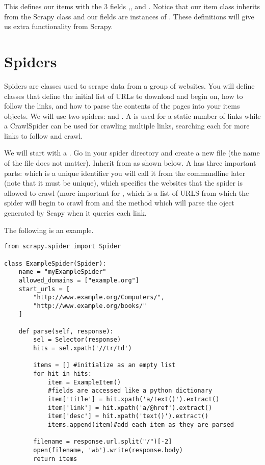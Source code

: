 This defines our items with the 3 fields ,, and . 
Notice that our item class inherits from the Scrapy class  and our fields are instances of . 
These definitions will give us extra functionality from Scrapy.

\section*{Spiders}
Spiders are classes used to scrape data from a group of websites. 
You will define classes that define the initial list of URLs to download and begin on, how to follow the links, and how to parse the contents of the pages into your items objects. We will use two spiders:  and . 
A  is used for a static number of links while a CrawlSpider can be used for crawling multiple links, searching each for more links to follow and crawl.

We will start with a . 
Go in your spider directory and create a new file (the name of the file does not matter). 
Inherit from  as shown below. 
A  has three important parts:  which is a unique identifier you will call it from the commandline later (note that it must be unique),  which specifies the websites that the spider is allowed to crawl (more important for ,  which is a list of URLS from which the spider will begin to crawl from and the method  which will parse the  oject generated by Scapy when it queries each link. 

The following is an example.
\begin{lstlisting}
from scrapy.spider import Spider

class ExampleSpider(Spider):
    name = "myExampleSpider"
    allowed_domains = ["example.org"]
    start_urls = [
        "http://www.example.org/Computers/",
        "http://www.example.org/books/"
    ]

    def parse(self, response):
        sel = Selector(response)
        hits = sel.xpath('//tr/td')

        items = [] #initialize as an empty list
        for hit in hits:
            item = ExampleItem()
			#fields are accessed like a python dictionary
            item['title'] = hit.xpath('a/text()').extract()
            item['link'] = hit.xpath('a/@href').extract()
            item['desc'] = hit.xpath('text()').extract()
            items.append(item)#add each item as they are parsed

		filename = response.url.split("/")[-2]
        open(filename, 'wb').write(response.body)
        return items

\end{lstlisting}

